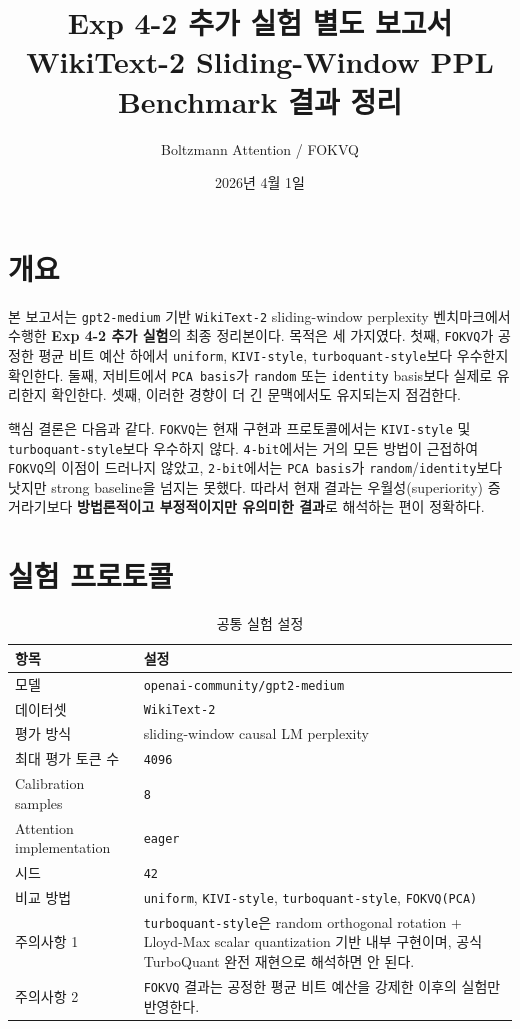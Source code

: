 \documentclass[11pt,a4paper]{article}
\title{\textbf{Exp 4-2 추가 실험 별도 보고서}\\[0.4em]
\large WikiText-2 Sliding-Window PPL Benchmark 결과 정리}
\author{Boltzmann Attention / FOKVQ}
\date{2026년 4월 1일}
\begin{document}
\maketitle

\section{개요}

본 보고서는 \texttt{gpt2-medium} 기반 \texttt{WikiText-2} sliding-window perplexity 벤치마크에서 수행한 \textbf{Exp 4-2 추가 실험}의 최종 정리본이다. 목적은 세 가지였다. 첫째, \texttt{FOKVQ}가 공정한 평균 비트 예산 하에서 \texttt{uniform}, \texttt{KIVI-style}, \texttt{turboquant-style}보다 우수한지 확인한다. 둘째, 저비트에서 \texttt{PCA basis}가 \texttt{random} 또는 \texttt{identity} basis보다 실제로 유리한지 확인한다. 셋째, 이러한 경향이 더 긴 문맥에서도 유지되는지 점검한다.

핵심 결론은 다음과 같다. \texttt{FOKVQ}는 현재 구현과 프로토콜에서는 \texttt{KIVI-style} 및 \texttt{turboquant-style}보다 우수하지 않다. \texttt{4-bit}에서는 거의 모든 방법이 근접하여 \texttt{FOKVQ}의 이점이 드러나지 않았고, \texttt{2-bit}에서는 \texttt{PCA basis}가 \texttt{random}/\texttt{identity}보다 낫지만 strong baseline을 넘지는 못했다. 따라서 현재 결과는 우월성(superiority) 증거라기보다 \textbf{방법론적이고 부정적이지만 유의미한 결과}로 해석하는 편이 정확하다.

\section{실험 프로토콜}

\begin{table}[H]
\centering
\caption{공통 실험 설정}
\label{tab:setup}
\small
\begin{tabularx}{\textwidth}{@{}lX@{}}
\toprule
\textbf{항목} & \textbf{설정} \\
\midrule
모델 & \texttt{openai-community/gpt2-medium} \\
데이터셋 & \texttt{WikiText-2} \\
평가 방식 & sliding-window causal LM perplexity \\
최대 평가 토큰 수 & \texttt{4096} \\
Calibration samples & \texttt{8} \\
Attention implementation & \texttt{eager} \\
시드 & \texttt{42} \\
비교 방법 & \texttt{uniform}, \texttt{KIVI-style}, \texttt{turboquant-style}, \texttt{FOKVQ(PCA)} \\
주의사항 1 & \texttt{turboquant-style}은 random orthogonal rotation + Lloyd-Max scalar quantization 기반 내부 구현이며, 공식 TurboQuant 완전 재현으로 해석하면 안 된다. \\
주의사항 2 & \texttt{FOKVQ} 결과는 공정한 평균 비트 예산을 강제한 이후의 실험만 반영한다. \\
\bottomrule
\end{tabularx}
\end{table}
\end{document}
